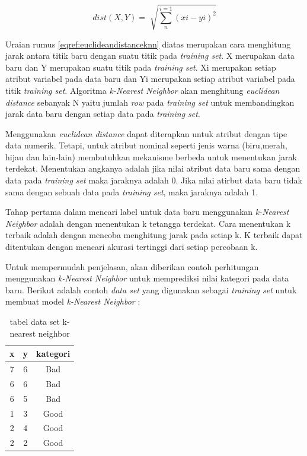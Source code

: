 \documentclass[a4paper,twoside]{article}
\begin{document}
\begin{enumerate}
\begin{equation}
	dist(X,Y) = \sqrt[]{\sum_{n}^{i=1}(xi-yi)^2}
	\label{eqref:euclideandistanceknn}
\end{equation}

Uraian rumus \eqref{eqref:euclideandistanceknn} diatas merupakan cara menghitung jarak antara titik baru dengan suatu titik pada \textit{training set}. X merupakan data baru dan Y merupakan suatu titik pada \textit{training set}. Xi merupakan setiap atribut variabel pada data baru dan Yi merupakan setiap atribut variabel pada titik \textit{training set}. Algoritma \textit{k-Nearest Neighbor} akan menghitung \textit{euclidean distance} sebanyak N yaitu jumlah \textit{row} pada \textit{training set} untuk membandingkan jarak data baru dengan setiap data pada \textit{training set}. 


Menggunakan \textit{euclidean distance} dapat diterapkan untuk atribut dengan tipe data numerik. Tetapi, untuk atribut nominal seperti jenis warna (biru,merah, hijau dan lain-lain) membutuhkan mekanisme berbeda untuk menentukan jarak terdekat. Menentukan angkanya adalah jika nilai atribut data baru sama dengan data pada \textit{training set} maka jaraknya adalah 0. Jika nilai atirbut data baru tidak sama dengan sebuah data pada \textit{training set}, maka jaraknya adalah 1. 

Tahap pertama dalam mencari label untuk data baru menggunakan \textit{k-Nearest Neighbor} adalah  dengan menentukan k tetangga terdekat. Cara menentukan k terbaik adalah dengan mencoba menghitung jarak pada setiap k. K terbaik dapat ditentukan dengan mencari akurasi tertinggi dari setiap percobaan k.

Untuk mempermudah penjelasan, akan diberikan contoh perhitungan menggunakan \textit{k-Nearest Neighbor} untuk memprediksi nilai kategori pada data baru. Berikut adalah contoh \textit{data set} yang digunakan sebagai \textit{training set} untuk membuat model \textit{k-Nearest Neighbor} : 

\begin{table}[ht]
\centering 

\begin{tabular}{|c|c|c|}
\hline 
x & y & kategori \\ 
\hline 
7 & 6 & Bad \\ 
\hline 
6 & 6 & Bad \\ 
\hline 
6 & 5 & Bad \\ 
\hline 
1 & 3 & Good \\ 
\hline 
2 & 4 & Good \\ 
\hline 
2 & 2 & Good \\ 
\hline 
\end{tabular} 
 \caption{tabel data set k-nearest neighbor}
 \label{tab:datasetknn}
 \end{table}
 

\end{enumerate}
\end{document}
